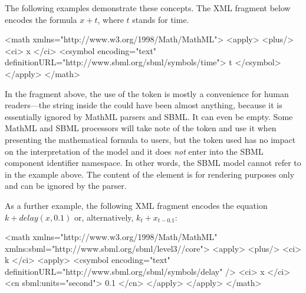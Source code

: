 \begin{itemize}

\end{itemize}

The following examples demonstrate these concepts.  The XML fragment below
encodes the formula $x + t$, where $t$ stands for time.

\begin{example}
<math xmlns="http://www.w3.org/1998/Math/MathML">
    <apply>
        <plus/>
        <ci> x </ci>
        <csymbol encoding="text" definitionURL="http://www.sbml.org/sbml/symbols/time">
            t
        </csymbol>
    </apply>
</math>
\end{example}


In the fragment above, the use of the token  is mostly a
convenience for human readers---the string inside the
 could have been almost anything, because it is
essentially ignored by MathML parsers and SBML.  It can
  even be empty.  Some MathML and SBML processors will take note
of the token and use it when presenting the mathematical formula
to users, but the token used has no impact on the interpretation
of the model and it does \emph{not} enter into the SBML component
identifier namespace.  In other words, the SBML model cannot refer
to  in the example above.  The content of the
 element is for rendering purposes only and can be
ignored by the parser.

As a further example, the following XML fragment encodes the equation
$k + delay(x, 0.1)$ or, alternatively, $k_t + x_{t - 0.1}$:

\begin{example}
<math xmlns="http://www.w3.org/1998/Math/MathML"
      xmlns:sbml="http://www.sbml.org/sbml/level3//core">
    <apply>
        <plus/>
        <ci> k </ci>
        <apply>
            <csymbol encoding="text" definitionURL="http://www.sbml.org/sbml/symbols/delay" />
            <ci> x </ci>
            <cn sbml:units="second"> 0.1 </cn>
        </apply>
    </apply>
</math>
\end{example}

